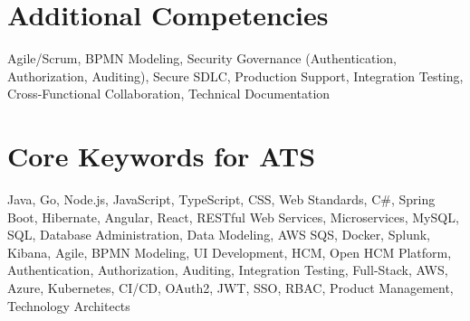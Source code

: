 \documentclass[10pt,a4paper]{article}
\begin{document}
\section{Additional Competencies}

Agile/Scrum, BPMN Modeling, Security Governance (Authentication, Authorization, Auditing), Secure SDLC, Production Support, Integration Testing, Cross-Functional Collaboration, Technical Documentation

\section{Core Keywords for ATS}

Java, Go, Node.js, JavaScript, TypeScript, CSS, Web Standards, C\#, Spring Boot, Hibernate, Angular, React, RESTful Web Services, Microservices, MySQL, SQL, Database Administration, Data Modeling, AWS SQS, Docker, Splunk, Kibana, Agile, BPMN Modeling, UI Development, HCM, Open HCM Platform, Authentication, Authorization, Auditing, Integration Testing, Full-Stack, AWS, Azure, Kubernetes, CI/CD, OAuth2, JWT, SSO, RBAC, Product Management, Technology Architects
\end{document}
